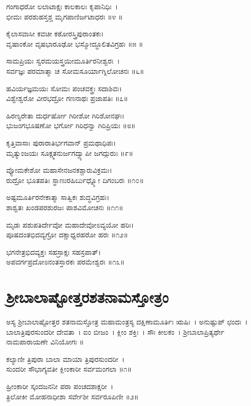 ಗಂಗಾಧರೋ ಲಲಾಟಾಕ್ಷಃ ಕಾಲಕಾಲಃ ಕೃಪಾನಿಧಿಃ~।\\
ಭೀಮಃ ಪರಶುಹಸ್ತಶ್ಚ ಮೃಗಪಾಣಿರ್ಜಟಾಧರಃ ॥೪ ॥

ಕೈಲಾಸವಾಸೀ ಕವಚೀ ಕಠೋರಸ್ತ್ರಿಪುರಾಂತಕಃ।\\
ವೃಷಾಂಕೋ ವೃಷಭಾರೂಢೋ ಭಸ್ಮೋದ್ಧೂಲಿತವಿಗ್ರಹಃ ॥೫ ॥

ಸಾಮಪ್ರಿಯಃ ಸ್ವರಮಯಸ್ತ್ರಯೀಮೂರ್ತಿರನೀಶ್ವರಃ~।\\
ಸರ್ವಜ್ಞಃ ಪರಮಾತ್ಮಾ ಚ ಸೋಮಸೂರ್ಯಾಗ್ನಿಲೋಚನಃ ॥೬॥

ಹವಿರ್ಯಜ್ಞಮಯಃ ಸೋಮಃ ಪಂಚವಕ್ತ್ರಃ ಸದಾಶಿವಃ।\\
ವಿಶ್ವೇಶ್ವರೋ ವೀರಭದ್ರೋ ಗಣನಾಥಃ ಪ್ರಜಾಪತಿಃ ॥೭॥

ಹಿರಣ್ಯರೇತಾ ದುರ್ಧರ್ಷೋ ಗಿರೀಶೋ ಗಿರಿಶೋನಘಃ।\\
ಭುಜಂಗಭೂಷಣೋ ಭರ್ಗೋ ಗಿರಿಧನ್ವಾ ಗಿರಿಪ್ರಿಯಃ ॥೮॥

ಕೃತ್ತಿವಾಸಾಃ ಪುರಾರಾತಿರ್ಭಗವಾನ್ ಪ್ರಮಥಾಧಿಪಃ।\\
ಮೃತ್ಯುಂಜಯಃ ಸೂಕ್ಷ್ಮತನುರ್ಜಗದ್ವ್ಯಾಪೀ ಜಗದ್ಗುರುಃ ॥೯॥

ವ್ಯೋಮಕೇಶೋ ಮಹಾಸೇನಜನಕಶ್ಚಾರುವಿಕ್ರಮಃ।\\
ರುದ್ರೋ ಭೂತಪತಿಃ ಸ್ಥಾಣುರಹಿರ್ಬುಧ್ನ್ಯೋ ದಿಗಂಬರಃ ॥೧೦॥

ಅಷ್ಟಮೂರ್ತಿರನೇಕಾತ್ಮಾ ಸಾತ್ವಿಕಃ ಶುದ್ಧವಿಗ್ರಹಃ।\\
ಶಾಶ್ವತಃ ಖಂಡಪರಶುರಜಃ ಪಾಶವಿಮೋಚನಃ ॥೧೧॥

ಮೃಡಃ ಪಶುಪತಿರ್ದೇವೋ ಮಹಾದೇವೋಽವ್ಯಯೋ ಹರಿಃ।\\
ಪೂಷದಂತಭಿದವ್ಯಗ್ರೋ ದಕ್ಷಾಧ್ವರಹರೋ ಹರಃ ॥೧೨॥

ಭಗನೇತ್ರಭಿದವ್ಯಕ್ತಃ ಸಹಸ್ರಾಕ್ಷಃ ಸಹಸ್ರಪಾತ್।\\
ಅಪವರ್ಗಪ್ರದೋಽನಂತಸ್ತಾರಕಃ ಪರಮೇಶ್ವರಃ ॥೧೩॥

\section{ಶ್ರೀಬಾಲಾಷ್ಟೋತ್ತರಶತನಾಮಸ್ತೋತ್ರಂ}
ಅಸ್ಯ ಶ್ರೀಬಾಲಾಷ್ಟೋತ್ತರ ಶತನಾಮಸ್ತೋತ್ರ ಮಹಾಮಂತ್ರಸ್ಯ  ದಕ್ಷಿಣಾಮೂರ್ತಿಃ ಋಷಿಃ~। ಅನುಷ್ಟುಪ್ ಛಂದಃ~। ಬಾಲಾತ್ರಿಪುರಸುಂದರೀ ದೇವತಾ~। ಐಂ ಬೀಜಂ~। ಕ್ಲೀಂ ಶಕ್ತಿಃ~। ಸೌಃ ಕೀಲಕಂ~।  ಶ್ರೀಬಾಲಾಪ್ರಿತ್ಯರ್ಥೇ ನಾಮಪಾರಾಯಣೇ ವಿನಿಯೋಗಃ ॥


ಕಲ್ಯಾಣೀ ತ್ರಿಪುರಾ ಬಾಲಾ ಮಾಯಾ ತ್ರಿಪುರಸುಂದರೀ~।\\
ಸುಂದರೀ ಸೌಭಾಗ್ಯವತೀ ಕ್ಲೀಂಕಾರೀ ಸರ್ವಮಂಗಲಾ ॥೧॥

ಹ್ರೀಂಕಾರೀ ಸ್ಕಂದಜನನೀ ಪರಾ ಪಂಚದಶಾಕ್ಷರೀ~।\\
ತ್ರಿಲೋಕೀ ಮೋಹನಾಧೀಶಾ ಸರ್ವೇಶೀ ಸರ್ವರೂಪಿಣೀ ॥೨॥

